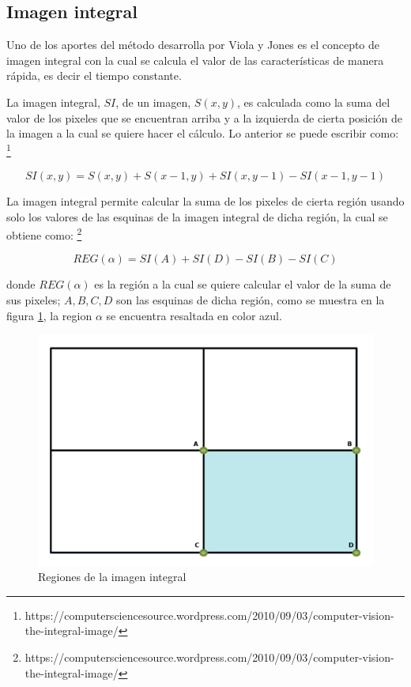 

\subsection{Imagen integral}\label{subsec:IntegralImage} 

Uno de los aportes del método desarrolla por Viola y Jones es el concepto de imagen integral con la cual se calcula el valor de las características de manera rápida, es decir el tiempo constante. 

La imagen integral, $SI$, de un imagen, $S(x,y)$, es calculada como la suma del valor de los pixeles que se encuentran arriba y a la izquierda de cierta posición de la imagen a la cual se quiere hacer el cálculo. Lo anterior se puede escribir como: \footnote{https://computersciencesource.wordpress.com/2010/09/03/computer-vision-the-integral-image/}     

$$SI(x,y)=S(x,y) + S(x-1,y) + SI(x,y-1)-SI(x-1,y-1)$$

La imagen integral permite calcular la suma de los pixeles de cierta región usando solo los valores de las esquinas de la imagen integral de dicha región, la cual se obtiene como: \footnote{https://computersciencesource.wordpress.com/2010/09/03/computer-vision-the-integral-image/}   

$$REG(\alpha)=SI(A)+SI(D)-SI(B)-SI(C)$$

donde $REG(\alpha)$ es la región a la cual se quiere calcular el valor de la suma de sus pixeles; $A,B,C,D$ son las esquinas de dicha región, como se muestra en la figura \ref{fig:figImageIntegral}, la region $\alpha$ se encuentra resaltada en color azul.  
\begin{figure}[!h]
\begin{center}
\includegraphics[scale=.3]{./Figures/IntegralImage.png}
\end{center}
\caption{Regiones de la imagen integral}
\label{fig:figImageIntegral}
\end{figure} 


